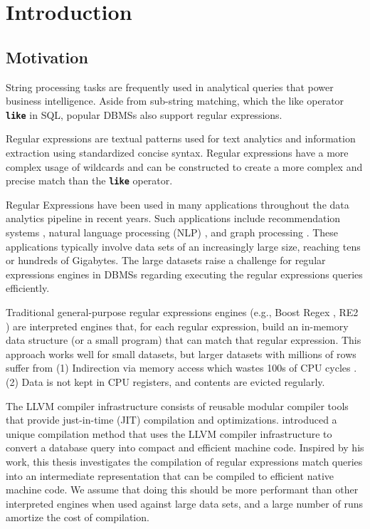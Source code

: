 
\chapter{Introduction}\label{chapter:introduction}

\section{Motivation}
String processing tasks are frequently used in analytical queries that power business intelligence. Aside from sub-string matching, which the like operator \texttt{\textbf{like}} in SQL, popular DBMSs also support regular expressions.

Regular expressions are textual patterns used for text analytics and information extraction using standardized concise syntax. Regular expressions have a more complex usage of wildcards and can be constructed to create a more complex and precise match than the \texttt{\textbf{like}} operator. 

Regular Expressions have been used in many applications throughout the data analytics pipeline in recent years. Such applications include recommendation systems \cite{recsys1}, natural language processing (NLP) \cite{nlp1, nlp2}, and graph processing \cite{graph1}. These applications typically involve data sets of an increasingly large size, reaching tens or hundreds of Gigabytes. The large datasets raise a challenge for regular expressions engines in DBMSs regarding  executing the regular expressions queries efficiently.

Traditional general-purpose regular expressions engines (e.g., Boost Regex \cite{Boost}, RE2 \cite{re2}) are interpreted engines that, for each regular expression, build an in-memory data structure (or a small program) that can match that regular expression. This approach works well for small datasets, but larger datasets with millions of rows suffer from (1) Indirection via memory access which wastes 100s of CPU cycles \cite{cpumemgap}. (2) Data is not kept in CPU registers, and contents are evicted regularly.

The LLVM compiler infrastructure \cite{llvm} consists of reusable modular compiler tools that provide just-in-time (JIT) compilation and optimizations. \citet{querycomp} introduced a unique compilation method that uses the LLVM compiler infrastructure to convert a database query into compact and efficient machine code. Inspired by his work, this thesis investigates the compilation of regular expressions match queries into an intermediate representation that can be compiled to efficient native machine code. We assume that doing this should be more performant than other interpreted engines when used against large data sets, and a large number of runs amortize the cost of compilation.

